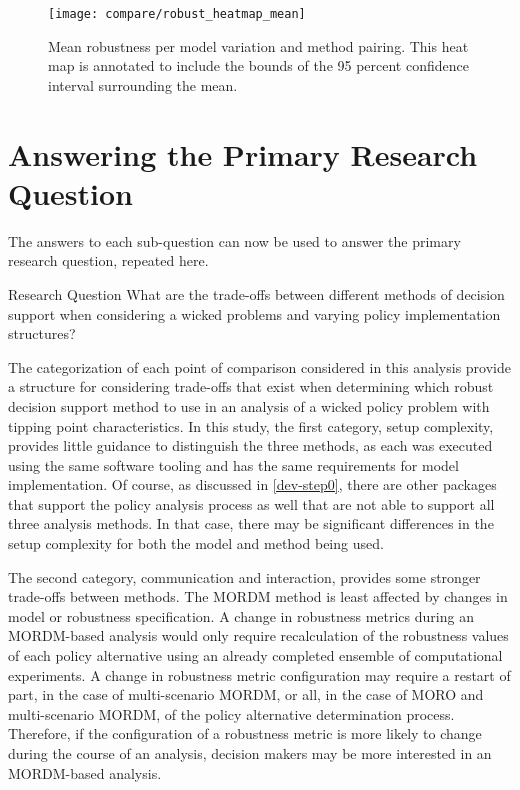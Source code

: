         \begin{figure}[H]
            \centering
            \captionsetup{width=0.8\textwidth}
            
            \texttt{[image: compare/robust\_heatmap\_mean]}
            \caption[Mean robustness per outcome of interest across all pairings]{Mean robustness per model variation and method pairing. This heat map is annotated to include the bounds of the 95 percent confidence interval surrounding the mean.}
            \label{fig:conclusion-robust-heatmap-mean}
        \end{figure}
              
\section{Answering the Primary Research Question}
The answers to each sub-question can now be used to answer the primary research question, repeated here. 

\begin{researchquestion}{Research Question}
    What are the trade-offs between different methods of decision support when considering a wicked problems and varying policy implementation structures? 
\end{researchquestion}

The categorization of each point of comparison considered in this analysis provide a structure for considering trade-offs that exist when determining which robust decision support method to use in an analysis of a wicked policy problem with tipping point characteristics. In this study, the first category, setup complexity, provides little guidance to distinguish the three methods, as each was executed using the same software tooling and has the same requirements for model implementation. Of course, as discussed in \cref{dev-step0}, there are other packages that support the policy analysis process as well that are not able to support all three analysis methods. In that case, there may be significant differences in the setup complexity for both the model and method being used. 

The second category, communication and interaction, provides some stronger trade-offs between methods. The MORDM method is least affected by changes in model or robustness specification. A change in robustness metrics during an MORDM-based analysis would only require recalculation of the robustness values of each policy alternative using an already completed ensemble of computational experiments. A change in robustness metric configuration may require a restart of part, in the case of multi-scenario MORDM, or all, in the case of MORO and multi-scenario MORDM, of the policy alternative determination process. Therefore, if the configuration of a robustness metric is more likely to change during the course of an analysis, decision makers may be more interested in an MORDM-based analysis. 

